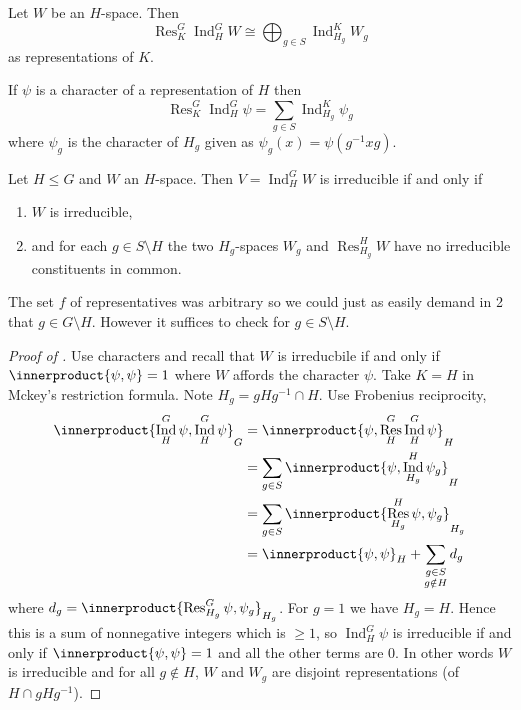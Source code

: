 \documentclass[a4paper]{article}
\newcommand*{\ip}{\innerproduct} %
\DeclareMathOperator{\Res}{Res} %
\DeclareMathOperator{\Ind}{Ind} %
\theoremstyle{definition}
\begin{document}
\begin{theorem}
  \label{thm:Mackey's restriction formula}
  Let \(W\) be an \(H\)-space. Then
  \[
    \Res_K^G \Ind_H^G W \cong \bigoplus_{g\in S} \Ind_{H_g}^K W_g
  \]
  as representations of \(K\).
\end{theorem}

\begin{corollary}
  If \(\psi\) is a character of a representation of \(H\) then
  \[
    \Res_K^G \Ind_H^G \psi = \sum_{g \in S} \Ind_{H_g}^K \psi_g
  \]
  where \(\psi_g\) is the character of \(H_g\) given as \(\psi_g(x) = \psi(g^{-1}xg)\).
\end{corollary}

\begin{corollary}
  \label{cor:Mackey's irreducibility criterion}
  Let \(H \leq G\) and \(W\) an \(H\)-space. Then \(V = \Ind_H^G W\) is irreducible if and only if
  \begin{enumerate}
  \item \(W\) is irreducible,
  \item and for each \(g \in S \setminus H\) the two \(H_g\)-spaces \(W_g\) and \(\Res_{H_g}^H W\) have no irreducible constituents in common.
  \end{enumerate}
\end{corollary}

\begin{remark}
  The set \(f\) of representatives was arbitrary so we could just as easily demand in 2 that \(g \in G \setminus H\). However it suffices to check for \(g \in S \setminus H\).
\end{remark}

\begin{proof}[Proof of ]
  Use characters and recall that \(W\) is irreducbile if and only if \(\ip{\psi, \psi} = 1\) where \(W\) affords the character \(\psi\). Take \(K = H\) in Mckey's restriction formula. Note \(H_g = gHg^{-1} \cap H\). Use Frobenius reciprocity,
  \begin{align*}
    \ip{\Ind_H^G \psi, \Ind_H^G \psi}_G
    &= \ip{\psi, \Res_H^G \Ind_H^G \psi}_H \\
    &= \sum_{g \in S} \ip{\psi, \Ind_{H_g}^H \psi_g}_H \\
    &= \sum_{g \in S} \ip{\Res_{H_g}^H \psi, \psi_g}_{H_g} \\
    &= \ip{\psi, \psi}_H + \sum_{\substack{g \in S \\ g \notin H}} d_g
  \end{align*}
  where \(d_g = \ip{\Res_{H_g}^G \psi, \psi_g}_{H_g}\). For \(g = 1\) we have \(H_g = H\). Hence this is a sum of nonnegative integers which is \(\geq 1\), so \(\Ind_H^G \psi\) is irreducible if and only if \(\ip{\psi, \psi} = 1\) and all the other terms are \(0\). In other words \(W\) is irreducible and for all \(g \notin H\), \(W\) and \(W_g\) are disjoint representations (of \(H \cap gHg^{-1}\)).
\end{proof}
\end{document}
